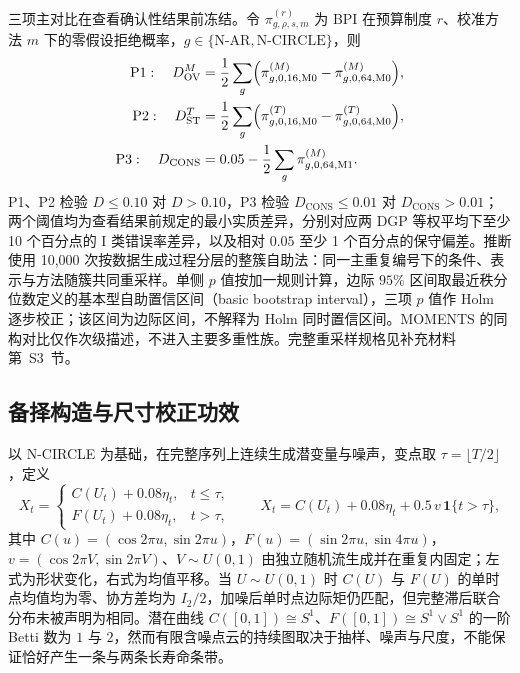 三项主对比在查看确认性结果前冻结。令 $\pi_{g,\rho,s,m}^{(r)}$ 为 BPI 在预算制度 $r$、校准方法 $m$ 下的零假设拒绝概率，$g\in\{\mathrm{N\text{-}AR},\mathrm{N\text{-}CIRCLE}\}$，则
\begin{equation}\label{eq:primary}
\begin{aligned}
 \mathrm{P1}:\quad D_{\mathrm{OV}}^{M}
 &=\frac12\sum_{g}\Bigl(\pi_{g,0,16,\mathrm{M0}}^{(M)}-\pi_{g,0,64,\mathrm{M0}}^{(M)}\Bigr),\\
 \mathrm{P2}:\quad D_{\mathrm{ST}}^{T}
 &=\frac12\sum_{g}\Bigl(\pi_{g,0,16,\mathrm{M0}}^{(T)}-\pi_{g,0,64,\mathrm{M0}}^{(T)}\Bigr),\\
 \mathrm{P3}:\quad D_{\mathrm{CONS}}
 &=0.05-\frac12\sum_{g}\pi_{g,0,64,\mathrm{M1}}^{(M)} .
\end{aligned}
\end{equation}
P1、P2 检验 $D\le0.10$ 对 $D>0.10$，P3 检验 $D_{\mathrm{CONS}}\le0.01$ 对 $D_{\mathrm{CONS}}>0.01$；两个阈值均为查看结果前规定的最小实质差异，分别对应两 DGP 等权平均下至少 10 个百分点的 I 类错误率差异，以及相对 $0.05$ 至少 1 个百分点的保守偏差。推断使用 10,000 次按数据生成过程分层的整簇自助法：同一主重复编号下的条件、表示与方法随簇共同重采样。单侧 $p$ 值按加一规则计算，边际 $95\%$ 区间取最近秩分位数定义的基本型自助置信区间（basic bootstrap interval），三项 $p$ 值作 Holm 逐步校正；该区间为边际区间，不解释为 Holm 同时置信区间。MOMENTS 的同构对比仅作次级描述，不进入主要多重性族。完整重采样规格见补充材料第~S3~节。

\subsection{备择构造与尺寸校正功效}\label{sec:alternatives}
以 N-CIRCLE 为基础，在完整序列上连续生成潜变量与噪声，变点取 $\tau=\lfloor T/2\rfloor$，定义
\begin{equation}\label{eq:alternatives}
 X_t=
 \begin{cases}
 C(U_t)+0.08\eta_t, & t\le\tau,\\
 F(U_t)+0.08\eta_t, & t>\tau,
 \end{cases}
 \qquad
 X_t=C(U_t)+0.08\eta_t+0.5\,v\,\mathbf 1\{t>\tau\},
\end{equation}
其中 $C(u)=(\cos2\pi u,\sin2\pi u)$，$F(u)=(\sin2\pi u,\sin4\pi u)$，$v=(\cos2\pi V,\sin2\pi V)$、$V\sim U(0,1)$ 由独立随机流生成并在重复内固定；左式为形状变化，右式为均值平移。当 $U\sim U(0,1)$ 时 $C(U)$ 与 $F(U)$ 的单时点均值均为零、协方差均为 $I_2/2$，加噪后单时点边际矩仍匹配，但完整滞后联合分布未被声明为相同。潜在曲线 $C([0,1])\cong S^1$、$F([0,1])\cong S^1\vee S^1$ 的一阶 Betti 数为 $1$ 与 $2$，然而有限含噪点云的持续图取决于抽样、噪声与尺度，不能保证恰好产生一条与两条长寿命条带。

